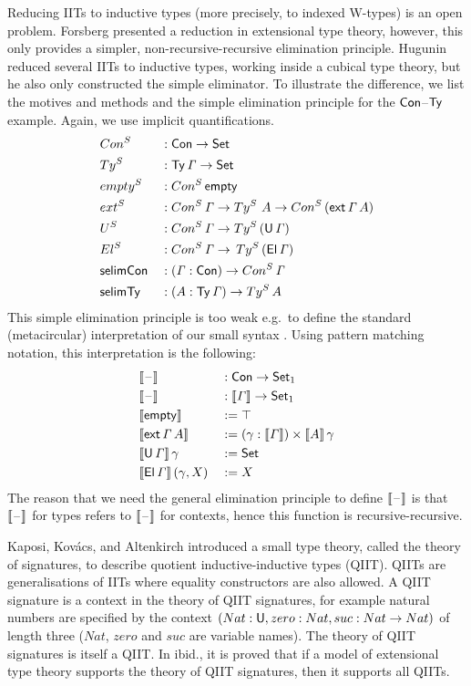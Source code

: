 \documentclass[a4paper,UKenglish,cleveref, autoref]{lipics-v2019}
\begin{document}
Reducing IITs to inductive types (more precisely, to indexed W-types)
is an open problem. Forsberg \cite{forsberg-phd} presented a reduction in
extensional type theory, however, this only provides a simpler,
non-recursive-recursive elimination principle. Hugunin \cite{jasper}
reduced several IITs to inductive types, working inside a cubical type
theory, but he also only constructed the simple eliminator. To
illustrate the difference, we list the motives and methods and the
simple elimination principle for the $\mathsf{Con}$--$\mathsf{Ty}$ example. Again, we
use implicit quantifications.
\begin{alignat*}{5}
  & Con^S && : \mathsf{Con}\rightarrow\mathsf{Set} \\
  & Ty^S && : \mathsf{Ty}\,\mathit{\Gamma}\rightarrow\mathsf{Set} \\
  & {empty}^S && : Con^S\,\mathsf{empty} \\
  & {ext}^S && : Con^S\,\mathit{\Gamma}\rightarrow Ty^S\,\,A\rightarrow Con^S\,(\mathsf{ext}\,\mathit{\Gamma}\,A) \\
  & U^S && : Con^S\,\mathit{\Gamma}\rightarrow Ty^S\,(\mathsf{U}\,\mathit{\Gamma}) \\
  & El^S && : Con^S\,\mathit{\Gamma}\rightarrow\,Ty^S\,(\mathsf{El}\,\mathit{\Gamma}) \\
  & \mathsf{selimCon} && : (\mathit{\Gamma}:\mathsf{Con})\rightarrow Con^S\,\mathit{\Gamma} \\
  & \mathsf{selimTy} && : (A:\mathsf{Ty}\,\mathit{\Gamma})\rightarrow Ty^S\,A
\end{alignat*}
This simple elimination principle is too weak e.g.\ to define the
standard (metacircular) interpretation of our small syntax
\cite{ttintt}. Using pattern matching notation, this interpretation is
the following:
\begin{alignat*}{5}
  & \llbracket\mathord{\hspace{1pt}\text{--}\hspace{1pt}}\rrbracket && : \mathsf{Con}\rightarrow\mathsf{Set}_1 \\
  & \llbracket\mathord{\hspace{1pt}\text{--}\hspace{1pt}}\rrbracket && : \llbracket\mathit{\Gamma}\rrbracket\rightarrow\mathsf{Set}_1 \\
  & \llbracket\mathsf{empty}\rrbracket && := \top \\
  & \llbracket\mathsf{ext}\,\mathit{\Gamma}\,A\rrbracket && := (\gamma:\llbracket\mathit{\Gamma}\rrbracket)\times\llbracket A\rrbracket\,\gamma \\
  & \llbracket\mathsf{U}\,\mathit{\Gamma}\rrbracket\,\gamma && := \mathsf{Set} \\
  & \llbracket\mathsf{El}\,\mathit{\Gamma}\rrbracket\,(\gamma,X) && := X
\end{alignat*}
The reason that we need the general elimination principle to define
$\llbracket\mathord{\hspace{1pt}\text{--}\hspace{1pt}}\rrbracket$ is that $\llbracket\mathord{\hspace{1pt}\text{--}\hspace{1pt}}\rrbracket$ for types refers to
$\llbracket\mathord{\hspace{1pt}\text{--}\hspace{1pt}}\rrbracket$ for contexts, hence this function is
recursive-recursive.

Kaposi, Kov{\'a}cs, and Altenkirch
\cite{Kaposi:2019:CQI:3302515.3290315} introduced a small type theory,
called the theory of signatures, to describe quotient
inductive-inductive types (QIIT). QIITs are generalisations of IITs
where equality constructors are also allowed. A QIIT signature is a
context in the theory of QIIT signatures, for example natural numbers
are specified by the context $(Nat:\mathsf{U},zero:Nat,suc:Nat\rightarrow Nat)$ of
length three ($Nat$, $zero$ and $suc$ are variable names). The theory
of QIIT signatures is itself a QIIT. In ibid., it is proved that if a
model of extensional type theory supports the theory of QIIT
signatures, then it supports all QIITs.
\end{document}
